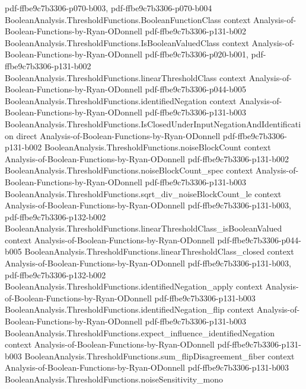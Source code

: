 \begin{lemma}
  {pdf-ffbe9c7b3306-p070-b003,
    pdf-ffbe9c7b3306-p070-b004}
\proofstep
  {BooleanAnalysis.ThresholdFunctions.BooleanFunctionClass}
  {context}
  {Analysis-of-Boolean-Functions-by-Ryan-ODonnell}
  {pdf-ffbe9c7b3306-p131-b002}
\proofstep
  {BooleanAnalysis.ThresholdFunctions.IsBooleanValuedClass}
  {context}
  {Analysis-of-Boolean-Functions-by-Ryan-ODonnell}
  {pdf-ffbe9c7b3306-p020-b001,
    pdf-ffbe9c7b3306-p131-b002}
\proofstep
  {BooleanAnalysis.ThresholdFunctions.linearThresholdClass}
  {context}
  {Analysis-of-Boolean-Functions-by-Ryan-ODonnell}
  {pdf-ffbe9c7b3306-p044-b005}
\proofstep
  {BooleanAnalysis.ThresholdFunctions.identifiedNegation}
  {context}
  {Analysis-of-Boolean-Functions-by-Ryan-ODonnell}
  {pdf-ffbe9c7b3306-p131-b003}
\proofstep
  {BooleanAnalysis.ThresholdFunctions.IsClosedUnderInputNegationAndIdentification}
  {direct}
  {Analysis-of-Boolean-Functions-by-Ryan-ODonnell}
  {pdf-ffbe9c7b3306-p131-b002}
\proofstep
  {BooleanAnalysis.ThresholdFunctions.noiseBlockCount}
  {context}
  {Analysis-of-Boolean-Functions-by-Ryan-ODonnell}
  {pdf-ffbe9c7b3306-p131-b002}
\proofstep
  {BooleanAnalysis.ThresholdFunctions.noiseBlockCount_spec}
  {context}
  {Analysis-of-Boolean-Functions-by-Ryan-ODonnell}
  {pdf-ffbe9c7b3306-p131-b003}
\proofstep
  {BooleanAnalysis.ThresholdFunctions.sqrt_div_noiseBlockCount_le}
  {context}
  {Analysis-of-Boolean-Functions-by-Ryan-ODonnell}
  {pdf-ffbe9c7b3306-p131-b003,
    pdf-ffbe9c7b3306-p132-b002}
\proofstep
  {BooleanAnalysis.ThresholdFunctions.linearThresholdClass_isBooleanValued}
  {context}
  {Analysis-of-Boolean-Functions-by-Ryan-ODonnell}
  {pdf-ffbe9c7b3306-p044-b005}
\proofstep
  {BooleanAnalysis.ThresholdFunctions.linearThresholdClass_closed}
  {context}
  {Analysis-of-Boolean-Functions-by-Ryan-ODonnell}
  {pdf-ffbe9c7b3306-p131-b003,
    pdf-ffbe9c7b3306-p132-b002}
\proofstep
  {BooleanAnalysis.ThresholdFunctions.identifiedNegation_apply}
  {context}
  {Analysis-of-Boolean-Functions-by-Ryan-ODonnell}
  {pdf-ffbe9c7b3306-p131-b003}
\proofstep
  {BooleanAnalysis.ThresholdFunctions.identifiedNegation_flip}
  {context}
  {Analysis-of-Boolean-Functions-by-Ryan-ODonnell}
  {pdf-ffbe9c7b3306-p131-b003}
\proofstep
  {BooleanAnalysis.ThresholdFunctions.expect_influence_identifiedNegation}
  {context}
  {Analysis-of-Boolean-Functions-by-Ryan-ODonnell}
  {pdf-ffbe9c7b3306-p131-b003}
\proofstep
  {BooleanAnalysis.ThresholdFunctions.sum_flipDisagreement_fiber}
  {context}
  {Analysis-of-Boolean-Functions-by-Ryan-ODonnell}
  {pdf-ffbe9c7b3306-p131-b003}
\proofstep
  {BooleanAnalysis.ThresholdFunctions.noiseSensitivity_mono}

\end{lemma}

